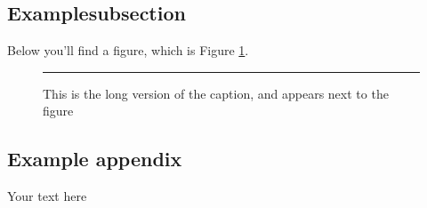 \documentclass[12pt,letterpaper]{article}
\begin{document}
    \lipsum[1]
    \subsection{Examplesubsection}
      Below you'll find a figure, which is Figure \ref{fig:examplefigure}.
      \begin{figure}[h!]
        \centering
        \rule{1 cm}{1 cm}
        \caption[Short caption for List of Figures]{This is the long version of the caption, and appears next to the figure}
        \label{fig:examplefigure}
      \end{figure}
      \lipsum
  \clearpage
  
  
  \clearpage
  \begin{appendices}
    \section{Example appendix}
      Your text here
  \end{appendices}
\end{document}
